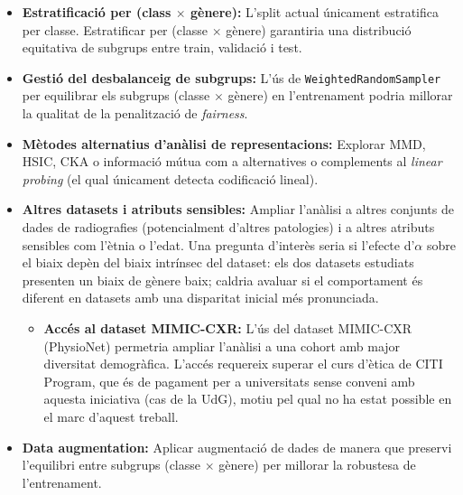 \documentclass[a4paper,12pt,twoside]{ThesisStyle}
\begin{document}
\begin{itemize}
    \item \textbf{Estratificació per (class $\times$ gènere):} L'split actual únicament estratifica per classe. Estratificar per (classe $\times$ gènere) garantiria una distribució equitativa de subgrups entre train, validació i test.
    \item \textbf{Gestió del desbalanceig de subgrups:} L'ús de \texttt{WeightedRandomSampler} per equilibrar els subgrups (classe $\times$ gènere) en l'entrenament podria millorar la qualitat de la penalització de \textit{fairness}.
    \item \textbf{Mètodes alternatius d'anàlisi de representacions:} Explorar MMD, HSIC, CKA o informació mútua com a alternatives o complements al \textit{linear probing} (el qual únicament detecta codificació lineal).
    \item \textbf{Altres datasets i atributs sensibles:} Ampliar l'anàlisi a altres conjunts de dades de radiografies (potencialment d'altres patologies) i a altres atributs sensibles com l'ètnia o l'edat. Una pregunta d'interès seria si l'efecte d'$\alpha$ sobre el biaix depèn del biaix intrínsec del dataset: els dos datasets estudiats presenten un biaix de gènere baix; caldria avaluar si el comportament és diferent en datasets amb una disparitat inicial més pronunciada.
    \begin{itemize}
        \item \textbf{Accés al dataset MIMIC-CXR:} L'ús del dataset MIMIC-CXR (PhysioNet) permetria ampliar l'anàlisi a una cohort amb major diversitat demogràfica. L'accés requereix superar el curs d'ètica de CITI Program, que és de pagament per a universitats sense conveni amb aquesta iniciativa (cas de la UdG), motiu pel qual no ha estat possible en el marc d'aquest treball.
    \end{itemize}
    \item \textbf{Data augmentation:} Aplicar augmentació de dades de manera que preservi l'equilibri entre subgrups (classe $\times$ gènere) per millorar la robustesa de l'entrenament.
\end{itemize}

\backmatter


%




\end{document}
